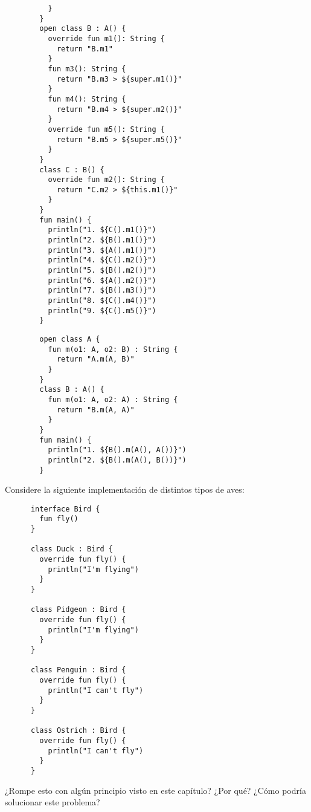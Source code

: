 \begin{Exercise}[title={Orden de ejecución}]
\begin{verbatim}
          }
        }
        open class B : A() {
          override fun m1(): String {
            return "B.m1"
          }
          fun m3(): String {
            return "B.m3 > ${super.m1()}"
          }
          fun m4(): String {
            return "B.m4 > ${super.m2()}"
          }
          override fun m5(): String {
            return "B.m5 > ${super.m5()}"
          }
        }
        class C : B() {
          override fun m2(): String {
            return "C.m2 > ${this.m1()}"
          }
        }
        fun main() {
          println("1. ${C().m1()}")
          println("2. ${B().m1()}")
          println("3. ${A().m1()}")
          println("4. ${C().m2()}")
          println("5. ${B().m2()}")
          println("6. ${A().m2()}")
          println("7. ${B().m3()}")
          println("8. ${C().m4()}")
          println("9. ${C().m5()}")
        }
      \end{verbatim}
    \Question
      \begin{verbatim}
        open class A {
          fun m(o1: A, o2: B) : String {
            return "A.m(A, B)"
          }
        }
        class B : A() {
          fun m(o1: A, o2: A) : String {
            return "B.m(A, A)"
          }
        }
        fun main() {
          println("1. ${B().m(A(), A())}")
          println("2. ${B().m(A(), B())}")
        }
      \end{verbatim}
  \end{Exercise}

  \begin{Exercise}[title={Aves}]
    Considere la siguiente implementación de distintos tipos de aves:

    \begin{verbatim}
      interface Bird {
        fun fly()
      }

      class Duck : Bird {
        override fun fly() {
          println("I'm flying")
        }
      }

      class Pidgeon : Bird {
        override fun fly() {
          println("I'm flying")
        }
      }

      class Penguin : Bird {
        override fun fly() {
          println("I can't fly")
        }
      }

      class Ostrich : Bird {
        override fun fly() {
          println("I can't fly")
        }
      }
    \end{verbatim}
    ¿Rompe esto con algún principio visto en este capítulo? 
    ¿Por qué?
    ¿Cómo podría solucionar este problema?
  \end{Exercise}

